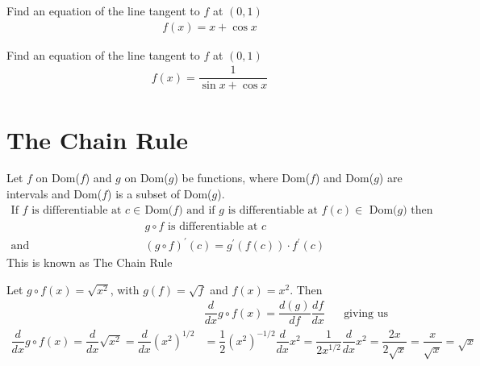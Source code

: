 \begin{exercise}
Find an equation of the line tangent to $f$ at $(0, 1)$
\begin{align*}
    f(x) = x + \cos x
\end{align*}
\end{exercise}

\begin{exercise}
Find an equation of the line tangent to $f$ at $(0, 1)$
\begin{align*}
    f(x) = \dfrac{1}{\sin x + \cos x}
\end{align*}
\end{exercise}

\newpage
\section{The Chain Rule}

\begin{theorem}
Let $f$ on Dom($f$) and $g$ on Dom($g$) be functions, where Dom($f$) and Dom($g$) are intervals and Dom($f$) is a subset of Dom($g$). 
\begin{align*}
    \text{If} \hspace{4pt} f \hspace{4pt} \text{is differentiable at} \hspace{4pt} c \in \hspace{4pt} &\text{Dom($f$) and if} \hspace{4pt} g \hspace{4pt} \text{is differentiable at} \hspace{4pt} f(c) \in \hspace{4pt} \text{Dom($g$) then}\\[2ex]
    &g \circ f \hspace{4pt} \text{is differentiable at} \hspace{4pt} c\\[2ex]
    \text{and} \hspace{4pt} &(g\circ f)^{'}(c) = g^{'}(f(c))\cdot f^{'}(c)
\end{align*}
This is known as The Chain Rule
\end{theorem}

\begin{example}
Let $g\circ f(x) = \sqrt{x^{2}}$, with $g(f) = \sqrt{f}$ and $f(x) = x^{2}$. Then
\begin{align*}
    &\dfrac{d}{dx}g\circ f(x) = \dfrac{d(g)}{df}\dfrac{df}{dx} \hspace{20pt} \text{giving us}\\[2ex]
    \dfrac{d}{dx}g\circ f(x) = \dfrac{d}{dx}\sqrt{x^{2}} = \dfrac{d}{dx}(x^{2})^{1/2} &= \dfrac{1}{2}(x^{2})^{-1/2}\dfrac{d}{dx}x^{2} = \dfrac{1}{2x^{1/2}}\dfrac{d}{dx}x^{2} = \dfrac{2x}{2\sqrt{x}} = \dfrac{x}{\sqrt{x}} = \sqrt{x}
\end{align*}
\end{example}

